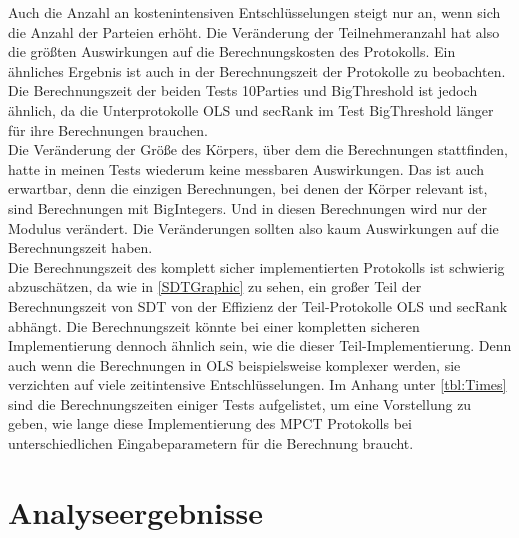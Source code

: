 Auch die Anzahl an kostenintensiven Entschlüsselungen steigt nur an, wenn sich die Anzahl der Parteien erhöht. Die Veränderung der Teilnehmeranzahl hat also die größten Auswirkungen auf die Berechnungskosten des Protokolls. Ein ähnliches Ergebnis ist auch in der Berechnungszeit der Protokolle zu beobachten.\\
Die Berechnungszeit der beiden Tests 10Parties und BigThreshold ist jedoch ähnlich, da die Unterprotokolle OLS und secRank im Test BigThreshold länger für ihre Berechnungen brauchen.\\
Die Veränderung der Größe des Körpers, über dem die Berechnungen stattfinden, hatte 
in meinen Tests wiederum keine messbaren Auswirkungen. Das ist auch erwartbar, denn die einzigen Berechnungen, bei denen der Körper relevant ist, sind Berechnungen mit BigIntegers. Und in diesen Berechnungen wird nur der Modulus verändert. Die Veränderungen sollten also kaum Auswirkungen auf die Berechnungszeit haben.\\

Die Berechnungszeit des komplett sicher implementierten Protokolls ist schwierig abzuschätzen, da wie in \ref{SDTGraphic} zu sehen, ein großer Teil der Berechnungszeit von SDT von der Effizienz der Teil-Protokolle OLS und secRank abhängt. Die Berechnungszeit könnte bei einer kompletten sicheren Implementierung dennoch ähnlich sein, wie die dieser Teil-Implementierung. Denn auch wenn die Berechnungen in OLS beispielsweise komplexer werden, sie verzichten auf viele zeitintensive Entschlüsselungen. Im Anhang unter \ref{tbl:Times} sind die Berechnungszeiten einiger Tests aufgelistet, um eine Vorstellung zu geben, wie lange diese Implementierung des MPCT Protokolls bei unterschiedlichen Eingabeparametern für die Berechnung braucht.

\section{Analyseergebnisse}

